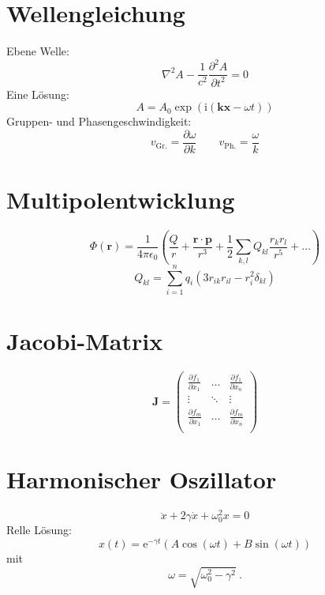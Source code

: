 \documentclass{scrartcl}
\begin{document}
\section{Wellengleichung}
Ebene Welle:
\begin{equation}
  \nabla^2 A - \frac{1}{c^2} \frac{\partial^2 A}{\partial t^2} = 0
\end{equation}
Eine Lösung:
\begin{equation}
  A = A_0 \exp(\mathrm{i} (\mathbf{k} \mathbf{x} - \omega t))
\end{equation}
Gruppen- und Phasengeschwindigkeit:
\begin{equation}
  v_\text{Gr.} = \frac{\partial \omega}{\partial k} \qquad v_\text{Ph.} = \frac{\omega}{k}
\end{equation}

\section{Multipolentwicklung}
\begin{equation}
  \Phi(\mathbf{r}) = \frac{1}{4\pi\epsilon_0}\left(\frac{Q}{r} +
  \frac{\mathbf{r} \cdot \mathbf{p}}{r^3} + \frac{1}{2} \sum_{k, l} Q_{kl} \frac{r_k r_l}{r^5} + \dots\right)
\end{equation}
\begin{equation*}
  Q_{kl} = \sum_{i = 1}^n q_i \left(3 r_{ik} r_{il} - r_i^2 \delta_{kl}\right)
\end{equation*}

\section{Jacobi-Matrix}
\begin{equation}
  \mathbf{J} =
  \begin{pmatrix}
    \frac{\partial f_1}{\partial x_1} & \dots  & \frac{\partial f_1}{\partial x_n} \\
    \vdots                            & \ddots & \vdots                            \\
    \frac{\partial f_m}{\partial x_1} & \dots  & \frac{\partial f_m}{\partial x_n} \\
  \end{pmatrix}
\end{equation}

\section{Harmonischer Oszillator}
\begin{equation}
  \ddot{x} + 2 \gamma \dot{x} + \omega_0^2 x = 0 
\end{equation}
Relle Lösung:
\begin{equation}
  x(t) = \mathrm{e}^{-\gamma t}\left(A \cos(\omega t) + B \sin(\omega t)\right)
\end{equation}
mit
\begin{equation}
  \omega = \sqrt{\omega_0^2 - \gamma^2}\:.
\end{equation}
\end{document}
